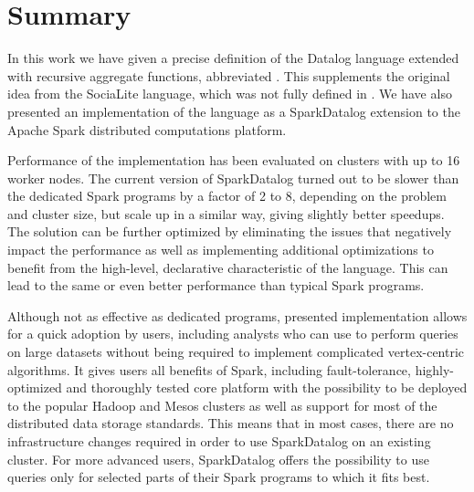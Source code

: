 

\chapter{Summary}\label{r:summary}

In this work we have given a precise definition of the Datalog language extended with recursive aggregate functions, abbreviated \datalogra. This supplements the original idea from the SociaLite language, which was not fully defined in \cite{socialite, distsoc}. We have also presented an implementation of the \datalogra language as a SparkDatalog extension to the Apache Spark distributed computations platform.

Performance of the implementation has been evaluated on clusters with up to 16 worker nodes. The current version of SparkDatalog turned out to be slower than the dedicated Spark programs by a factor of 2 to 8, depending on the problem and cluster size, but scale up in a similar way, giving slightly better speedups. The solution can be further optimized by eliminating the issues that negatively impact the performance as well as implementing additional optimizations to benefit from the high-level, declarative characteristic of the language. This can lead to the same or even better performance than typical Spark programs.

Although not as effective as dedicated programs, presented implementation allows for a quick adoption by users, including analysts who can use \datalogra to perform queries on large datasets without being required to implement complicated vertex-centric algorithms. It gives users all benefits of Spark, including fault-tolerance, highly-optimized and thoroughly tested core platform with the possibility to be deployed to the popular Hadoop and Mesos clusters as well as support for most of the distributed data storage standards. This means that in most cases, there are no infrastructure changes required in order to use SparkDatalog on an existing cluster. For more advanced users, SparkDatalog offers the possibility to use \datalogra queries only for selected parts of their Spark programs to which it fits best.


